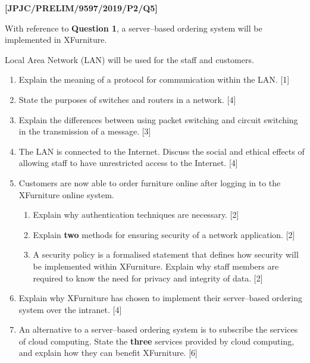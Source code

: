 \item \textbf{{[}JPJC/PRELIM/9597/2019/P2/Q5{]} }

With reference to \textbf{Question 1}, a server--based ordering system
will be implemented in XFurniture.

Local Area Network (LAN) will be used for the staff and customers.
\begin{enumerate}
\item Explain the meaning of a protocol for communication within the LAN.
\hfill{}{[}1{]}
\item State the purposes of switches and routers in a network. \hfill{}{[}4{]}
\item Explain the differences between using packet switching and circuit
switching in the transmission of a message. \hfill{} {[}3{]}
\item The LAN is connected to the Internet. Discuss the social and ethical
effects of allowing staff to have unrestricted access to the Internet.
\hfill{}{[}4{]}
\item Customers are now able to order furniture online after logging in
to the XFurniture online system. 
\begin{enumerate}
\item Explain why authentication techniques are necessary. \hfill{} {[}2{]}
\item Explain \textbf{two} methods for ensuring security of a network application.
\hfill{}{[}2{]}
\item A security policy is a formalised statement that defines how security
will be implemented within XFurniture. Explain why staff members are
required to know the need for privacy and integrity of data. \hfill{}{[}2{]}
\end{enumerate}
\item Explain why XFurniture has chosen to implement their server--based
ordering system over the intranet. \hfill{}{[}4{]}
\item An alternative to a server--based ordering system is to subscribe
the services of cloud computing. State the \textbf{three} services
provided by cloud computing, and explain how they can benefit XFurniture.
\hfill{} {[}6{]}
\end{enumerate}
